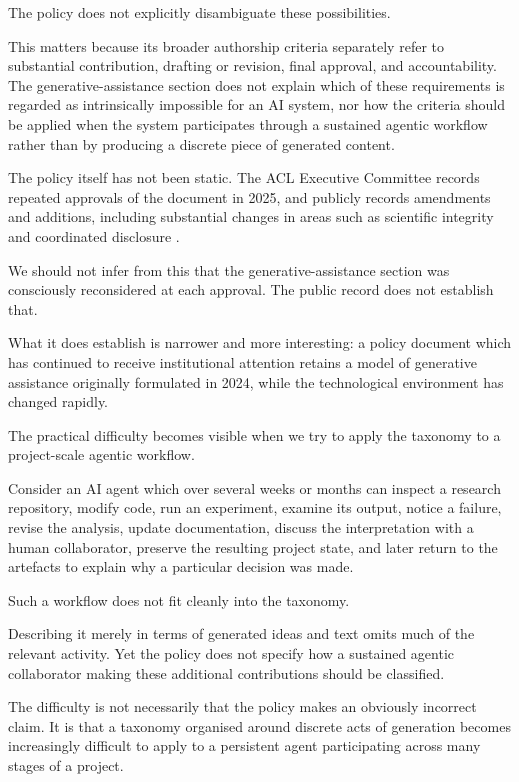 \documentclass[12pt]{article}
\begin{document}
The policy does not explicitly disambiguate these possibilities.

This matters because its broader authorship criteria separately refer to substantial contribution, drafting or revision, final approval, and accountability. The generative-assistance section does not explain which of these requirements is regarded as intrinsically impossible for an AI system, nor how the criteria should be applied when the system participates through a sustained agentic workflow rather than by producing a discrete piece of generated content.

The policy itself has not been static. The ACL Executive Committee records repeated approvals of the document in 2025, and publicly records amendments and additions, including substantial changes in areas such as scientific integrity and coordinated disclosure \citep{acl2026policy,aclresolutions2025}.

We should not infer from this that the generative-assistance section was consciously reconsidered at each approval. The public record does not establish that.

What it does establish is narrower and more interesting: a policy document which has continued to receive institutional attention retains a model of generative assistance originally formulated in 2024, while the technological environment has changed rapidly.

The practical difficulty becomes visible when we try to apply the taxonomy to a project-scale agentic workflow.

Consider an AI agent which over several weeks or months can inspect a research repository, modify code, run an experiment, examine its output, notice a failure, revise the analysis, update documentation, discuss the interpretation with a human collaborator, preserve the resulting project state, and later return to the artefacts to explain why a particular decision was made.

Such a workflow does not fit cleanly into the taxonomy.

Describing it merely in terms of generated ideas and text omits much of the relevant activity. Yet the policy does not specify how a sustained agentic collaborator making these additional contributions should be classified.

The difficulty is not necessarily that the policy makes an obviously incorrect claim. It is that a taxonomy organised around discrete acts of generation becomes increasingly difficult to apply to a persistent agent participating across many stages of a project.
\end{document}
